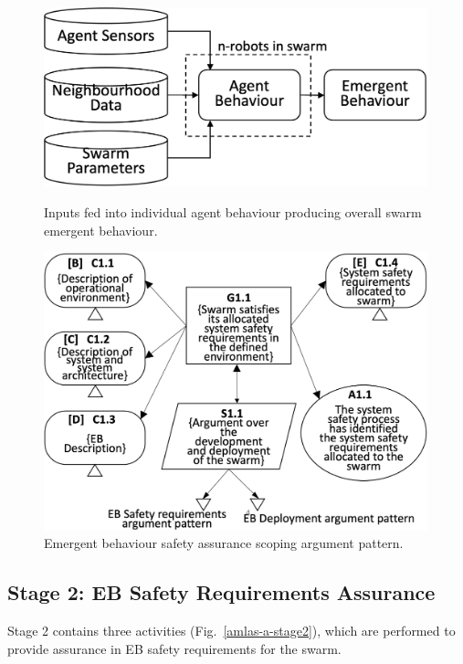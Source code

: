 \documentclass[runningheads]{llncs}
\begin{document}
\begin{figure}[!t]
	\centering
	\begin{minipage}[b]{.45\textwidth}
		\centering
		\includegraphics[width=0.99\textwidth]{figures/stage1-systema-v2.png}
		\caption{Inputs fed into individual agent behaviour producing overall swarm emergent behaviour. }%
		\label{system-description}
	\end{minipage}%
	\hspace*{0.03\textwidth}
	\begin{minipage}[b]{.5\textwidth}
		\centering
		\includegraphics[width=0.99\textwidth]{figures/stage1-argumentpattern-v3.png}
		\vspace{-5ex}
		\caption{Emergent behaviour safety assurance scoping argument pattern.}
		\label{stage1-ap}
	\end{minipage}	
	\vspace{-4ex}
\end{figure}
\subsection{Stage 2: EB Safety Requirements Assurance} \label{framework-stage2}
Stage 2 contains three activities (Fig.~\ref{amlas-a-stage2}), which are performed to provide assurance in EB safety requirements for the swarm. 
\end{document}
